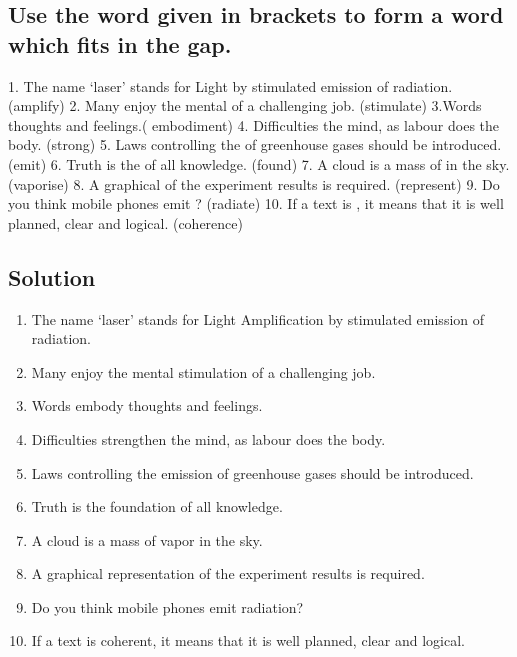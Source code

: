 \subsection*{Use the word given in brackets to form a word which fits in the gap.}
1. The name ‘laser’ stands for Light \underline{\hspace{2cm}} by stimulated emission of
radiation. (amplify) 2. Many enjoy the mental \underline{\hspace{2cm}} of a challenging
job. (stimulate) 3.Words \underline{\hspace{2cm}} thoughts and feelings.( embodiment)
4. Difficulties \underline{\hspace{2cm}} the mind, as labour does the body. (strong)
5. Laws controlling the \underline{\hspace{2cm}} of greenhouse gases should be
introduced. (emit) 6. Truth is the \underline{\hspace{2cm}} of all knowledge. (found)
7. A cloud is a mass of \underline{\hspace{2cm}} in the sky. (vaporise) 8. A graphical
\underline{\hspace{2cm}} of the experiment results is required. (represent) 9. Do you
think mobile phones emit \underline{\hspace{2cm}} ? (radiate) 10. If a text is
\underline{\hspace{2cm}}, it means that it is well planned, clear and logical.
(coherence)

\subsection*{Solution}
\begin{enumerate}
      \item The name ‘laser’ stands for Light Amplification by stimulated emission of
            radiation.
      \item Many enjoy the mental stimulation of a challenging job.
      \item Words embody thoughts and feelings.
      \item Difficulties strengthen the mind, as labour does the body.
      \item Laws controlling the emission of greenhouse gases should be introduced.
      \item Truth is the foundation of all knowledge.
      \item A cloud is a mass of vapor in the sky.
      \item A graphical representation of the experiment results is required.
      \item Do you think mobile phones emit radiation?
      \item If a text is coherent, it means that it is well planned, clear and logical.
\end{enumerate}

